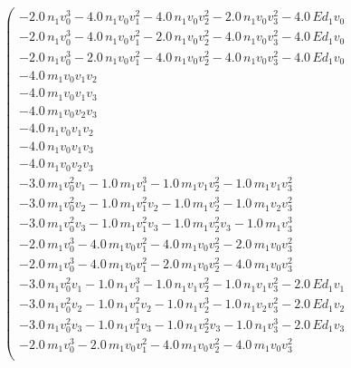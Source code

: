 \documentclass{article}
\begin{document}
\begin{equation}
\label{polynomial system}
\left(\begin{array}{r}
-2.0 \, n_{1} v_{0}^{3} - 4.0 \, n_{1} v_{0} v_{1}^{2} - 4.0 \, n_{1} v_{0} v_{2}^{2} - 2.0 \, n_{1} v_{0} v_{3}^{2} - 4.0 \, E d_{1} v_{0} \\
-2.0 \, n_{1} v_{0}^{3} - 4.0 \, n_{1} v_{0} v_{1}^{2} - 2.0 \, n_{1} v_{0} v_{2}^{2} - 4.0 \, n_{1} v_{0} v_{3}^{2} - 4.0 \, E d_{1} v_{0} \\
-2.0 \, n_{1} v_{0}^{3} - 2.0 \, n_{1} v_{0} v_{1}^{2} - 4.0 \, n_{1} v_{0} v_{2}^{2} - 4.0 \, n_{1} v_{0} v_{3}^{2} - 4.0 \, E d_{1} v_{0} \\
-4.0 \, m_{1} v_{0} v_{1} v_{2} \\
-4.0 \, m_{1} v_{0} v_{1} v_{3} \\
-4.0 \, m_{1} v_{0} v_{2} v_{3} \\
-4.0 \, n_{1} v_{0} v_{1} v_{2} \\
-4.0 \, n_{1} v_{0} v_{1} v_{3} \\
-4.0 \, n_{1} v_{0} v_{2} v_{3} \\
-3.0 \, m_{1} v_{0}^{2} v_{1} - 1.0 \, m_{1} v_{1}^{3} - 1.0 \, m_{1} v_{1} v_{2}^{2} - 1.0 \, m_{1} v_{1} v_{3}^{2} \\
-3.0 \, m_{1} v_{0}^{2} v_{2} - 1.0 \, m_{1} v_{1}^{2} v_{2} - 1.0 \, m_{1} v_{2}^{3} - 1.0 \, m_{1} v_{2} v_{3}^{2} \\
-3.0 \, m_{1} v_{0}^{2} v_{3} - 1.0 \, m_{1} v_{1}^{2} v_{3} - 1.0 \, m_{1} v_{2}^{2} v_{3} - 1.0 \, m_{1} v_{3}^{3} \\
-2.0 \, m_{1} v_{0}^{3} - 4.0 \, m_{1} v_{0} v_{1}^{2} - 4.0 \, m_{1} v_{0} v_{2}^{2} - 2.0 \, m_{1} v_{0} v_{3}^{2} \\
-2.0 \, m_{1} v_{0}^{3} - 4.0 \, m_{1} v_{0} v_{1}^{2} - 2.0 \, m_{1} v_{0} v_{2}^{2} - 4.0 \, m_{1} v_{0} v_{3}^{2} \\
-3.0 \, n_{1} v_{0}^{2} v_{1} - 1.0 \, n_{1} v_{1}^{3} - 1.0 \, n_{1} v_{1} v_{2}^{2} - 1.0 \, n_{1} v_{1} v_{3}^{2} - 2.0 \, E d_{1} v_{1} \\
-3.0 \, n_{1} v_{0}^{2} v_{2} - 1.0 \, n_{1} v_{1}^{2} v_{2} - 1.0 \, n_{1} v_{2}^{3} - 1.0 \, n_{1} v_{2} v_{3}^{2} - 2.0 \, E d_{1} v_{2} \\
-3.0 \, n_{1} v_{0}^{2} v_{3} - 1.0 \, n_{1} v_{1}^{2} v_{3} - 1.0 \, n_{1} v_{2}^{2} v_{3} - 1.0 \, n_{1} v_{3}^{3} - 2.0 \, E d_{1} v_{3} \\
-2.0 \, m_{1} v_{0}^{3} - 2.0 \, m_{1} v_{0} v_{1}^{2} - 4.0 \, m_{1} v_{0} v_{2}^{2} - 4.0 \, m_{1} v_{0} v_{3}^{2} \\

\end{array}
\end{equation}
\end{document}
